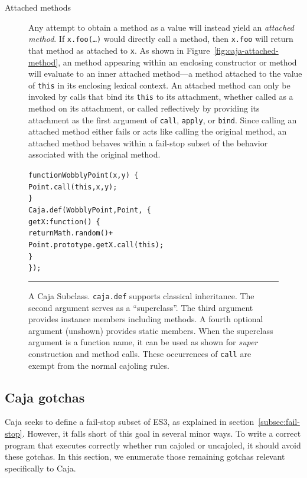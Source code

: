 \documentclass[letterpaper,twocolumn,10pt]{article}
\newcommand{\code}[1]{{\tt {#1}}}              %
\begin{document}
\begin{description}
   \item[Attached methods] Any attempt to obtain a method as a value will 
   instead yield an \emph{attached method}. If \code{x.foo(\ldots)} would 
   directly call a method, then \code{x.foo} will return that method as 
   attached to \code{x}. As shown in Figure~\ref{fig:caja-attached-method}, an 
   method appearing within an enclosing constructor or method will evaluate 
   to an inner attached method---a method attached to the value of \code{this} in its enclosing lexical context. 
   An attached method can only be invoked by calls that bind its \code{this} 
   to its attachment, whether called as a method on its attachment, or called 
   reflectively by providing its attachment as the first argument of 
   \code{call}, \code{apply}, or \code{bind}. Since calling an attached 
   method either fails or acts like calling the original method, an attached 
   method behaves within a fail-stop subset of the behavior associated with the original method.
  
\end{description}

\begin{figure}[t!]
\begin{alltt}
function WobblyPoint(x, y)\ \{
  Point.call(this, x, y);
\}
Caja.def(WobblyPoint, Point,\ \{
  getX: function()\ \{ 
    return Math.random() +
      Point.prototype.getX.call(this); 
  \}
\});
\end{alltt}

\caption[A Caja Subclass.]{A Caja Subclass. \code{caja.def} supports 
classical inheritance. The second argument serves as a ``superclass''. The 
third argument provides instance members including methods. A fourth optional 
argument (unshown) provides static members. When the superclass argument is a 
function name, it can be used as shown for \emph{super} construction and 
method calls. These occurrences of \code{call} are exempt from the normal 
cajoling rules. \\ } \hrule
\label{fig:caja-subclass}
\end{figure}


\subsection{Caja gotchas}
\label{subsec:caja-gotchas}

Caja seeks to define a fail-stop subset of ES3, as explained in section~\ref{subsec:fail-stop}. However, 
it falls short of this goal in several minor ways. To write a correct program 
that executes correctly whether run cajoled or uncajoled, it should 
avoid these gotchas. In this section, we enumerate those remaining gotchas
relevant specifically to Caja.
\end{document}
